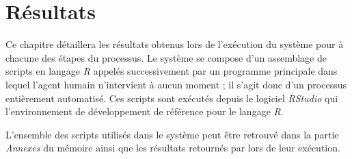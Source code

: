 \chapter{Résultats}
Ce chapitre détaillera les résultats obtenus lors de l'exécution du système pour à chacune des étapes du processus. Le système se compose d'un assemblage de scripts en langage \textit{R} appelés successivement par un programme principale dans lequel l'agent humain n'intervient à aucun moment ; il s'agit donc d'un processus entièrement automatisé. Ces scripts sont exécutés depuis le logiciel \textit{RStudio} qui l'environnement de développement de référence pour le langage \textit{R}.

L'ensemble des scripts utilisés dans le système peut être retrouvé dans la partie \textit{Annexes} du mémoire ainsi que les résultats retournés par lors de leur exécution.






